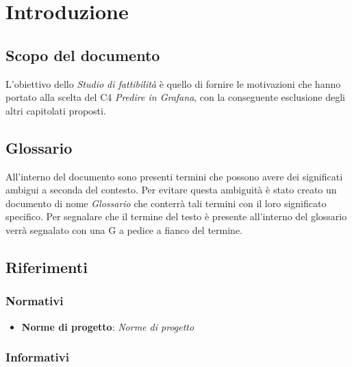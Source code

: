 \documentclass{article}
\begin{document}


\section{Introduzione}%
\label{sec:introduzione}

\subsection{Scopo del documento}%
\label{sub:scopo_del_documento}
L'obiettivo dello \textit{Studio di fattibilità} è quello di fornire le motivazioni che hanno portato alla scelta del  C4 \emph{Predire in Grafana}, con la conseguente esclusione degli altri capitolati proposti.

\subsection{Glossario}%
\label{sub:glossario}
All'interno del documento sono presenti termini che possono avere dei significati ambigui a seconda del contesto. Per evitare questa ambiguità è stato creato un documento di nome \textit{Glossario} che conterrà tali termini con il loro significato specifico. Per segnalare che il termine del testo è presente all'interno del glossario verrà segnalato con una G a pedice a fianco del termine.

\subsection{Riferimenti}%
\label{sub:riferimenti}

\subsubsection{Normativi}%
\label{subs:normativi}

\begin{itemize}
  \item \textbf{Norme di progetto}: \textit{Norme di progetto}
\end{itemize}

\subsubsection{Informativi}%
\label{subs:informativi}
\end{document}
